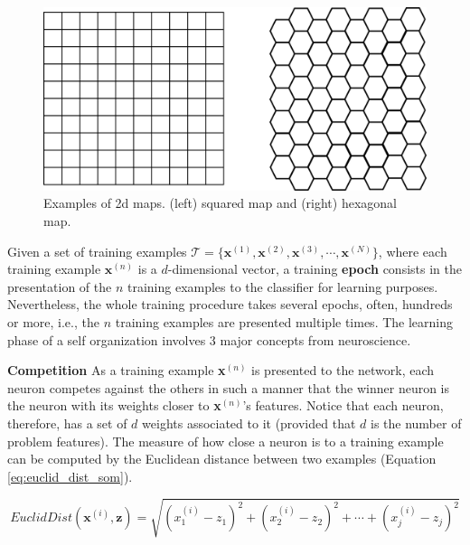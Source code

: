 \begin{figure}[h]
\centering
\includegraphics[scale=0.08]{ "Part 3 - Learning Systems/Unsupervised Learning/Self-Organizing Maps/figs/maps"}
\caption{Examples of 2d maps. (left) squared map and (right) hexagonal map.}
\label{fig:topologic}
\end{figure}

Given a set of training examples $\mathcal{T} = \{\mathbf{x}^{(1)},\mathbf{x}^{(2)},\mathbf{x}^{(3)},\cdots,\mathbf{x}^{(N)}\}$, where each training example $\mathbf{x}^{(n)}$ is a $d$-dimensional vector, a training \textbf{epoch} consists in the presentation of the $n$ training examples to the classifier for learning purposes. Nevertheless, the whole training procedure takes several epochs, often, hundreds or more, i.e., the $n$ training examples are presented multiple times. The learning phase of a self organization involves 3 major concepts from neuroscience.
\vspace{0.2cm}

\noindent\textbf{Competition} As a training example \textbf{x}$^{(n)}$ is presented to the network, each neuron competes against the others in such a manner that the winner neuron is the neuron with its weights closer to \textbf{x}$^{(n)}$'s features. Notice that each neuron, therefore, has a set of $d$ weights associated to it (provided that $d$ is the number of problem features). The measure of how close a neuron is to a training example can be computed by the Euclidean distance between two examples (Equation \ref{eq:euclid_dist_som}).

\begin{equation}
    EuclidDist(\textbf{x}^{(i)},\textbf{z}) = \sqrt{(x^{(i)}_{1} - z_1)^{2} + (x^{(i)}_{2} - z_2)^{2} + \cdots + (x^{(i)}_j - z_j)^{2}}
    \label{eq:euclid_dist_som}
\end{equation}

\vspace{0.2cm}

